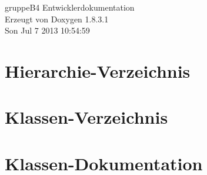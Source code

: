 \documentclass{book}
\begin{document}
\hypersetup{pageanchor=false,citecolor=blue}
\begin{titlepage}
\vspace*{7cm}
\begin{center}
{\Large gruppe\-B4 Entwicklerdokumentation }\\
\vspace*{1cm}
{\large Erzeugt von Doxygen 1.8.3.1}\\
\vspace*{0.5cm}
{\small Son Jul 7 2013 10:54:59}\\
\end{center}
\end{titlepage}
\clearemptydoublepage
{}
\tableofcontents
\clearemptydoublepage
{}
\hypersetup{pageanchor=true,citecolor=blue}
\chapter{Hierarchie-\/\-Verzeichnis}

\chapter{Klassen-\/\-Verzeichnis}

\chapter{Klassen-\/\-Dokumentation}































\printindex
\end{document}
